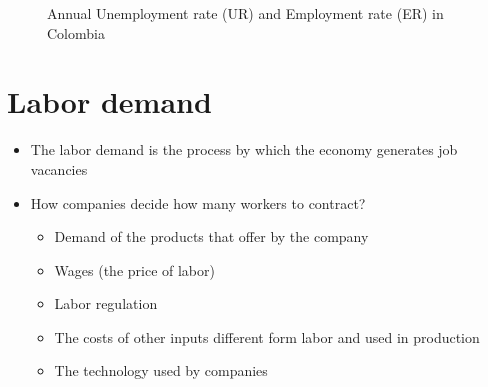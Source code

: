 \documentclass[
  ignorenonframetext,
]{beamer}
\providecommand{\tightlist}{%
  \setlength{\itemsep}{0pt}\setlength{\parskip}{0pt}}\usepackage{longtable,booktabs,array}
\begin{document}
\begin{frame}{}
\label{section-6}
\begin{figure}


\caption{\label{fig-ur-er-col}Annual Unemployment rate (UR) and
Employment rate (ER) in Colombia}

\end{figure}%
\end{frame}

\section{Labor demand}\label{labor-demand}

\begin{frame}{}
\label{section-7}
\begin{itemize}
\item
  The labor demand is the process by which the economy generates job
  vacancies
\item
  How companies decide how many workers to contract?

  \begin{itemize}
  \tightlist
  \item
    Demand of the products that offer by the company
  \item
    Wages (the price of labor)
  \item
    Labor regulation
  \item
    The costs of other inputs different form labor and used in
    production
  \item
    The technology used by companies
  \end{itemize}
\end{itemize}
\end{frame}
\end{document}
